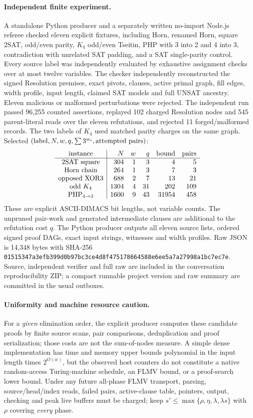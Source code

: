 \documentclass[11pt]{article}
\begin{document}
\paragraph{Independent finite experiment.}
A standalone Python producer and a separately written no-import Node.js referee checked eleven explicit fixtures, including Horn, renamed Horn, square 2SAT, odd/even parity, $K_4$ odd/even Tseitin, PHP with 3 into 2 and 4 into 3, contradiction with unrelated SAT padding, and a SAT single-parity control. Every source label was independently evaluated by exhaustive assignment checks over at most twelve variables. The checker independently reconstructed the signed Resolution premises, exact pivots, clauses, active primal graph, fill edges, width profile, input length, claimed SAT models and full UNSAT ancestry. Eleven malicious or malformed perturbations were rejected. The independent run passed 96,255 counted assertions, replayed 102 charged Resolution nodes and 545 parent-literal reads over the eleven refutations, and rejected 11 forged/malformed records. The two labels of $K_4$ used matched parity charges on the same graph. Selected $({\rm label},N,w,q,\sum 3^{w_i},{\rm attempted\ pairs})$:
\[
\begin{array}{c|rrrrr}
{\rm instance}&N&w&q&{\rm bound}&{\rm pairs}\\
\hline
{\rm 2SAT\ square}&304&1&3&4&5\\
{\rm Horn\ chain}&264&1&3&7&3\\
{\rm opposed\ XOR3}&688&2&7&13&21\\
{\rm odd\ }K_4&1304&4&31&202&109\\
{\rm PHP}_{4\to3}&1600&9&43&31954&458
\end{array}
\]
These are explicit ASCII-DIMACS bit lengths, not variable counts. The unpruned pair-work and generated intermediate clauses are additional to the refutation cost $q$. The Python producer outputs all eleven source lists, ordered signed proof DAGs, exact input strings, witnesses and width profiles. Raw JSON is 14,348 bytes with SHA-256 \texttt{01515347a3efb399d0b97bc3ce4d8f475178664588e6ee5a7a27998a1bc7ec7e}. Source, independent verifier and full raw are included in the conversation reproducibility ZIP; a compact runnable project version and raw summary are committed in the usual outboxes.

\paragraph{Uniformity and machine resource caution.}
For a \emph{given} elimination order, the explicit producer computes these candidate proofs by finite source scans, pair comparisons, deduplication and proof serialization; those costs are not the sum-of-nodes measure. A simple dense implementation has time and memory upper bounds polynomial in the input length times $2^{O(w)}$, but the observed host counters do not constitute a native random-access Turing-machine schedule, an FLMV bound, or a proof-search lower bound. Under any future all-phase FLMV transport, parsing, source/head/index reads, failed pairs, active-clause table, pointers, output, checking and peak live buffers must be charged; keep $s'\le\max\{\rho,\eta,\lambda,\lambda s\}$ with $\rho$ covering \emph{every} phase.
\end{document}
